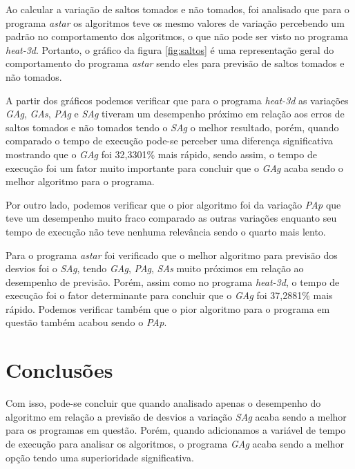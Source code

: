 \documentclass[journal, twoside]{IEEEtran}
\begin{document}
Ao calcular a variação de saltos tomados e não tomados, foi analisado que para o programa \textit{astar} os algoritmos teve os mesmo valores de variação percebendo um padrão no comportamento dos algoritmos, o que não pode ser visto no programa \textit{heat-3d}. Portanto, o gráfico da figura \ref{fig:saltos} é uma representação geral do comportamento do programa \textit{astar} sendo eles para previsão de saltos tomados e não tomados.

A partir dos gráficos podemos verificar que para o programa \textit{heat-3d} as variações \textit{GAg}, \textit{GAs}, \textit{PAg} e \textit{SAg} tiveram um desempenho próximo em relação aos erros de saltos tomados e não tomados tendo o \textit{SAg} o melhor resultado, porém, quando comparado o tempo de execução pode-se perceber uma diferença significativa mostrando que o \textit{GAg} foi 32,3301\% mais rápido, sendo assim, o tempo de execução foi um fator muito importante para concluir que o \textit{GAg} acaba sendo o melhor algoritmo para o programa.

Por outro lado, podemos verificar que o pior algoritmo foi da variação \textit{PAp} que teve um desempenho muito fraco comparado as outras variações enquanto seu tempo de execução não teve nenhuma relevância sendo o quarto mais lento.

Para o programa \textit{astar} foi verificado que o melhor algoritmo para previsão dos desvios foi o \textit{SAg}, tendo \textit{GAg}, \textit{PAg}, \textit{SAs} muito próximos em relação ao desempenho de previsão. Porém, assim como no programa \textit{heat-3d}, o tempo de execução foi o fator determinante para concluir que o \textit{GAg} foi 37,2881\% mais rápido. Podemos verificar também que o pior algoritmo para o programa em questão também acabou sendo o \textit{PAp}.

\section{Conclusões} \label{conclusao}

Com isso, pode-se concluir que quando analisado apenas o desempenho do algoritmo em relação a previsão de desvios a variação \textit{SAg} acaba sendo a melhor para os programas em questão. Porém, quando adicionamos a variável de tempo de execução para analisar os algoritmos, o programa \textit{GAg} acaba sendo a melhor opção tendo uma superioridade significativa.

  

\ifCLASSOPTIONcaptionsoff
  \newpage
\fi
\end{document}
